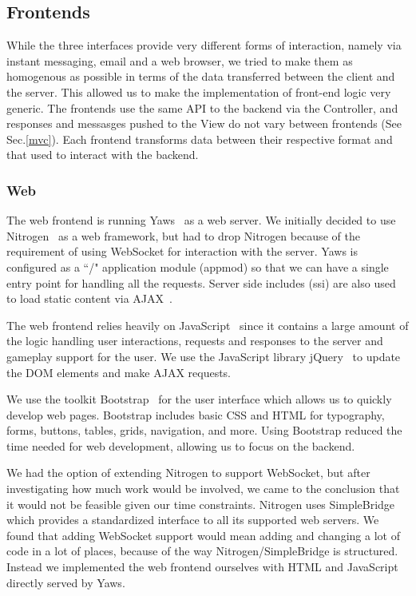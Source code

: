 \documentclass[11pt,a4paper]{report}
\begin{document}
\subsection{Frontends}
\label{sec:frontends}
While the three interfaces provide very different forms of interaction, namely
via instant messaging, email and a web browser, we tried to make them as homogenous
as possible in terms of the data transferred between the client and the server.
This allowed us to make the implementation of front-end logic very generic. The
frontends use the same API to the backend via the Controller, and responses
and messasges pushed to the View do not vary between frontends (See Sec.\ref{mvc}).
Each frontend transforms data between their respective format and that used to
interact with the backend.

\subsubsection{Web}
The web frontend is running Yaws~\cite{yaws} as a web server.
We initially decided to use Nitrogen~\cite{nitrogen} as a web framework,
but had to drop Nitrogen because of the requirement of using WebSocket for
interaction with the server. Yaws is configured as a ``/" application
module (appmod) so that we can have a single entry point for handling all the
requests. Server side includes (ssi) are also used to load static content via
AJAX~\cite{ajax}.

The web frontend relies heavily on JavaScript~\cite{javascript} since it contains
a large amount of the logic handling user interactions, requests and responses
to the server and gameplay support for the user. We use the JavaScript library
jQuery~\cite{jquery} to update the DOM elements and make AJAX requests.

We use the toolkit Bootstrap~\cite{bootstrap} for the user interface which
allows us to quickly develop web pages. Bootstrap includes basic CSS and HTML for
typography, forms, buttons, tables, grids, navigation, and more. Using Bootstrap
reduced the time needed for web development, allowing us to focus on the
backend.

We had the option of extending Nitrogen to support WebSocket, but after
investigating how much work would be involved, we came to the conclusion that it
would not be feasible given our time constraints. Nitrogen uses
SimpleBridge~\cite{simple_bridge} which provides a standardized interface to all
its supported web servers. We found that adding WebSocket support would mean
adding and changing a lot of code in a lot of places, because of the way
Nitrogen/SimpleBridge is structured. Instead we implemented the web frontend
ourselves with HTML and JavaScript directly served by Yaws.
\end{document}
